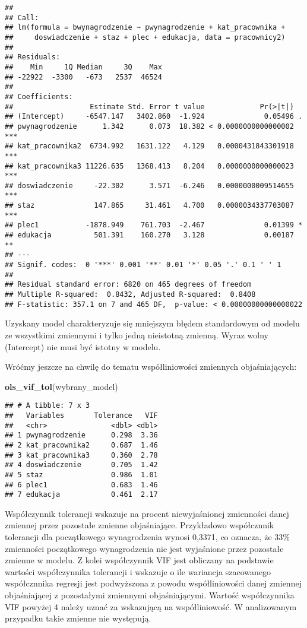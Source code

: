 \documentclass[]{book}
\newenvironment{Shaded}{\begin{snugshade}}{\end{snugshade}}
\newcommand{\KeywordTok}[1]{\textcolor[rgb]{0.13,0.29,0.53}{\textbf{#1}}}
\newcommand{\NormalTok}[1]{#1}
\begin{document}
\begin{verbatim}
## 
## Call:
## lm(formula = bwynagrodzenie ~ pwynagrodzenie + kat_pracownika + 
##     doswiadczenie + staz + plec + edukacja, data = pracownicy2)
## 
## Residuals:
##    Min     1Q Median     3Q    Max 
## -22922  -3300   -673   2537  46524 
## 
## Coefficients:
##                  Estimate Std. Error t value             Pr(>|t|)    
## (Intercept)     -6547.147   3402.860  -1.924              0.05496 .  
## pwynagrodzenie      1.342      0.073  18.382 < 0.0000000000000002 ***
## kat_pracownika2  6734.992   1631.122   4.129   0.0000431843301918 ***
## kat_pracownika3 11226.635   1368.413   8.204   0.0000000000000023 ***
## doswiadczenie     -22.302      3.571  -6.246   0.0000000009514655 ***
## staz              147.865     31.461   4.700   0.0000034337703087 ***
## plec1           -1878.949    761.703  -2.467              0.01399 *  
## edukacja          501.391    160.270   3.128              0.00187 ** 
## ---
## Signif. codes:  0 '***' 0.001 '**' 0.01 '*' 0.05 '.' 0.1 ' ' 1
## 
## Residual standard error: 6820 on 465 degrees of freedom
## Multiple R-squared:  0.8432, Adjusted R-squared:  0.8408 
## F-statistic: 357.1 on 7 and 465 DF,  p-value: < 0.00000000000000022
\end{verbatim}

Uzyskany model charakteryzuje się mniejszym błędem standardowym od
modelu ze wszystkimi zmiennymi i tylko jedną nieistotną zmienną. Wyraz
wolny (Intercept) nie musi być istotny w modelu.

Wróćmy jeszcze na chwilę do tematu współliniowości zmiennych
objaśniających:

\begin{Shaded}
\begin{Highlighting}[]
\KeywordTok{ols_vif_tol}\NormalTok{(wybrany_model)}
\end{Highlighting}
\end{Shaded}

\begin{verbatim}
## # A tibble: 7 x 3
##   Variables       Tolerance   VIF
##   <chr>               <dbl> <dbl>
## 1 pwynagrodzenie      0.298  3.36
## 2 kat_pracownika2     0.687  1.46
## 3 kat_pracownika3     0.360  2.78
## 4 doswiadczenie       0.705  1.42
## 5 staz                0.986  1.01
## 6 plec1               0.683  1.46
## 7 edukacja            0.461  2.17
\end{verbatim}

Współczynnik tolerancji wskazuje na procent niewyjaśnionej zmienności
danej zmiennej przez pozostałe zmienne objaśniające. Przykładowo
współcznnik tolerancji dla początkowego wynagrodzenia wynosi 0,3371, co
oznacza, że 33\% zmienności początkowego wynagrodzenia nie jest
wyjaśnione przez pozostałe zmienne w modelu. Z kolei współczynnik VIF
jest obliczany na podstawie wartości współczynnika tolerancji i wskazuje
o ile wariancja szacowanego współcznnika regresji jest podwyższona z
powodu współliniowości danej zmiennej objaśniającej z pozostałymi
zmiennymi objaśniającymi. Wartość współczynnika VIF powyżej 4 należy
uznać za wskazującą na współliniowość. W analizowanym przypadku takie
zmienne nie występują.
\end{document}
